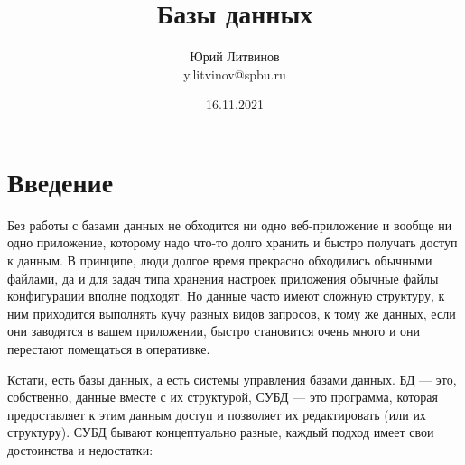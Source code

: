 \documentclass[a5paper]{article}
\title{Базы данных}
\author{Юрий Литвинов\\\small{y.litvinov@spbu.ru}}
\date{16.11.2021}
\begin{document}
\maketitle
\thispagestyle{empty}

\section{Введение}

Без работы с базами данных не обходится ни одно веб-приложение и вообще ни одно приложение, которому надо что-то долго хранить и быстро получать доступ к данным. В принципе, люди долгое время прекрасно обходились обычными файлами, да и для задач типа хранения настроек приложения обычные файлы конфигурации вполне подходят. Но данные часто имеют сложную структуру, к ним приходится выполнять кучу разных видов запросов, к тому же данных, если они заводятся в вашем приложении, быстро становится очень много и они перестают помещаться в оперативке.

Кстати, есть базы данных, а есть системы управления базами данных. БД --- это, собственно, данные вместе с их структурой, СУБД --- это программа, которая предоставляет к этим данным доступ и позволяет их редактировать (или их структуру). СУБД бывают концептуально разные, каждый подход имеет свои достоинства и недостатки:
\end{document}
